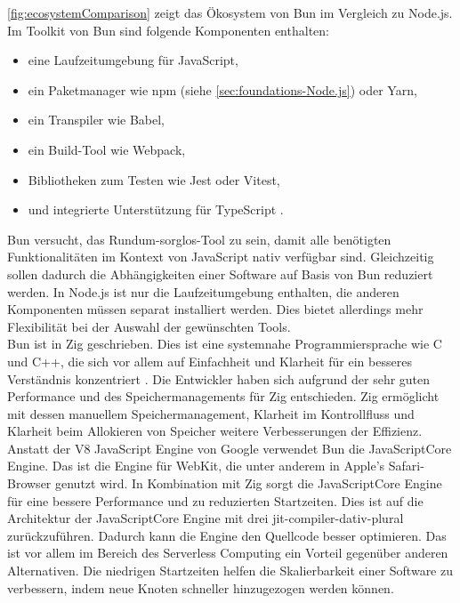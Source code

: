 \noindent
\autoref{fig:ecosystemComparison} zeigt das Ökosystem von Bun im Vergleich zu Node.js. Im Toolkit von Bun sind folgende Komponenten enthalten:
\begin{itemize}
	\item eine Laufzeitumgebung für JavaScript,
	\item ein Paketmanager wie \ac{npm} (siehe \autoref{sec:foundations-Node.js}) oder Yarn, 
	\item ein Transpiler wie Babel,
	\item ein Build-Tool wie Webpack,
	\item Bibliotheken zum Testen wie Jest oder Vitest,
	\item und integrierte Unterstützung für TypeScript \cite{Sumner.2023c}.
\end{itemize}

\noindent
Bun versucht, das Rundum-sorglos-Tool zu sein, damit alle benötigten Funktionalitäten im Kontext von JavaScript nativ verfügbar sind. Gleichzeitig sollen dadurch die Abhängigkeiten einer Software auf Basis von Bun reduziert werden. In Node.js ist nur die Laufzeitumgebung enthalten, die anderen Komponenten müssen separat installiert werden. Dies bietet allerdings mehr Flexibilität bei der Auswahl der gewünschten Tools.\cite{Springer.2022, OvenSh.2023c}\\

\noindent
Bun ist in Zig geschrieben. Dies ist eine systemnahe Programmiersprache wie C und C++, die sich vor allem auf Einfachheit und Klarheit für ein besseres Verständnis konzentriert \cite{ZigSoftwareFoundation.o.J.}. Die Entwickler haben sich aufgrund der sehr guten Performance und des Speichermanagements für Zig entschieden. Zig ermöglicht mit dessen manuellem Speichermanagement, Klarheit im Kontrollfluss und Klarheit beim Allokieren von Speicher weitere Verbesserungen der Effizienz. Anstatt der V8 JavaScript Engine von Google verwendet Bun die JavaScriptCore Engine. Das ist die Engine für WebKit, die unter anderem in Apple's Safari-Browser genutzt wird. In Kombination mit Zig sorgt die JavaScriptCore Engine für eine bessere Performance und zu reduzierten Startzeiten. Dies ist auf die Architektur der JavaScriptCore Engine mit drei \ac{jit-compiler-dativ-plural} zurückzuführen. Dadurch kann die Engine den Quellcode besser optimieren. Das ist vor allem im Bereich des Serverless Computing ein Vorteil gegenüber anderen Alternativen. Die niedrigen Startzeiten helfen die Skalierbarkeit einer Software zu verbessern, indem neue Knoten schneller hinzugezogen werden können.\cite{OvenSh.2023c, OvenSh.2022, Apple.o.J., Apple.o.J.b, Silva.2020}

